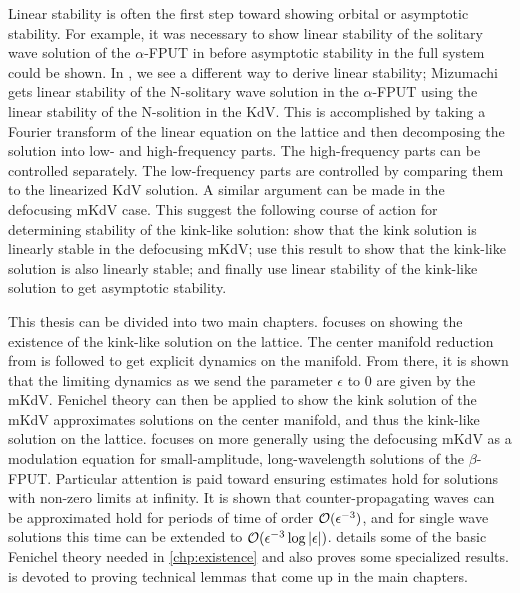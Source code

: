 Linear stability is often the first step toward showing orbital or asymptotic stability. For example, it was necessary to show linear stability of the solitary wave solution of the \(\alpha\)-FPUT in \cite{friesecke2003solitary,friesecke2004solitary} before asymptotic stability in the full system could be shown. In \cite{mizumachi2013asymptotic}, we see a different way to derive linear stability; Mizumachi gets linear stability of the N-solitary wave solution in the \(\alpha\)-FPUT using the linear stability of the N-solition in the KdV. This is accomplished by taking a Fourier transform of the linear equation on the lattice and then decomposing the solution into low- and high-frequency parts. The high-frequency parts can be controlled separately. The low-frequency parts are controlled by comparing them to the linearized KdV solution. A similar argument can be made in the defocusing mKdV case. This suggest the following course of action for determining stability of the kink-like solution: show that the kink solution is linearly stable in the defocusing mKdV; use this result to show that the kink-like solution is also linearly stable; and finally use linear stability of the kink-like solution to get asymptotic stability.

This thesis can be divided into two main chapters.  focuses on showing the existence of the kink-like solution on the lattice. The center manifold reduction from \cite{iooss2000travelling} is followed to get explicit dynamics on the manifold. From there, it is shown that the limiting dynamics as we send the parameter \(\epsilon\) to \(0\) are given by the mKdV. Fenichel theory can then be applied to show the kink solution of the mKdV approximates solutions on the center manifold, and thus the kink-like solution on the lattice.  focuses on more generally using the defocusing  mKdV as a modulation equation for small-amplitude, long-wavelength solutions of the \(\beta\)-FPUT. Particular attention is paid toward ensuring estimates hold for solutions with non-zero limits at infinity. It is shown that counter-propagating waves can be approximated hold for periods of time of order \(\mathcal{O}(\epsilon^{-3})\), and for single wave solutions this time can be extended to \(\mathcal{O}(\epsilon^{-3} \log|\epsilon|)\).  details some of the basic Fenichel theory needed in \cref{chp:existence} and also proves some specialized results.  is devoted to proving technical lemmas that come up in the main chapters.